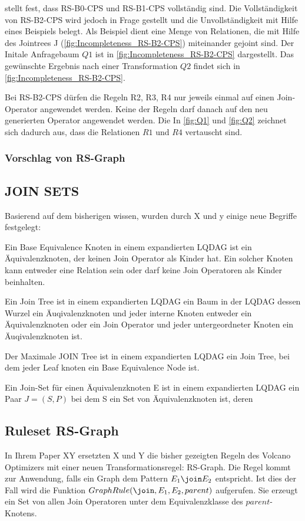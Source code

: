 \cite{shanbhag2014optimizing} stellt fest, dass RS-B0-CPS und RS-B1-CPS vollständig sind. Die Vollständigkeit von RS-B2-CPS wird jedoch in Frage gestellt und die Unvollständigkeit mit Hilfe eines Beispiels belegt. Als Beispiel dient eine Menge von Relationen, die mit Hilfe des Jointrees J (\ref{fig:Incompleteness_RS-B2-CPS}) miteinander gejoint sind. Der Initale Anfragebaum $Q1$ ist in \ref{fig:Incompleteness_RS-B2-CPS} dargestellt. Das gewünschte Ergebnis nach einer Transformation $Q2$  findet sich in \ref{fig:Incompleteness_RS-B2-CPS}. 

Bei RS-B2-CPS dürfen die Regeln R2, R3, R4 nur jeweils einmal auf einen Join-Operator angewendet werden. Keine der Regeln darf danach auf den neu generierten Operator angewendet werden. Die In \ref{fig:Q1} und \ref{fig:Q2} zeichnet sich dadurch aus, dass die Relationen $R1$ und $R4$ vertauscht sind.







\subsubsection{Vorschlag von RS-Graph}

\subsection{JOIN SETS}

Basierend auf dem bisherigen wissen, wurden durch X und y einige neue Begriffe festgelegt:

Ein Base Equivalence Knoten in einem expandierten LQDAG ist ein Äquivalenzknoten, der keinen Join Operator als Kinder hat. Ein solcher Knoten kann entweder eine Relation sein oder darf keine Join Operatoren als Kinder beinhalten.

Ein Join Tree ist in einem expandierten LQDAG ein Baum in der LQDAG dessen Wurzel ein Äuqivalenzknoten und jeder interne Knoten entweder ein Äquivalenzknoten oder ein Join Operator und jeder untergeordneter Knoten ein Äuqivalenzknoten ist.

Der Maximale JOIN Tree ist in einem expandierten LQDAG ein Join Tree, bei dem jeder Leaf knoten ein Base Equivalence Node ist.

Ein Join-Set für einen Äquivalenzknoten E ist in einem expandierten LQDAG ein Paar $J = (S, P)$ bei dem S ein Set von Äquivalenzknoten ist, deren 

\subsection{Ruleset RS-Graph}
In Ihrem Paper XY ersetzten X und Y die bisher gezeigten Regeln des Volcano Optimizers mit einer neuen Transformationsregel: RS-Graph. Die Regel kommt zur Anwendung, falls ein Graph dem Pattern $E_1 \join E_2$ entspricht. Ist dies der Fall wird die Funktion $GraphRule(\join, E_1, E_2, parent)$ aufgerufen. Sie erzeugt ein Set von allen Join Operatoren unter dem Equivalenzklasse des $parent$-Knotens.





\cite{shanbhag2014optimizing}